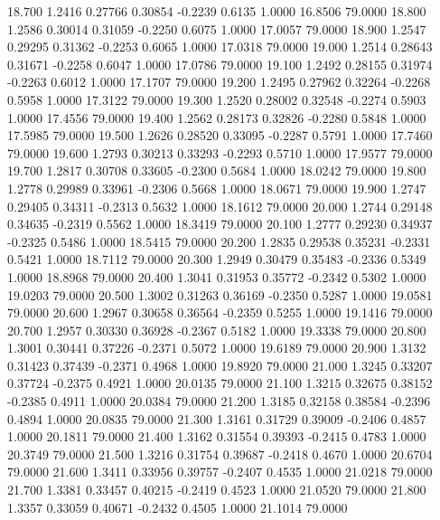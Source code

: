   18.700   1.2416   0.27766   0.30854  -0.2239   0.6135   1.0000  16.8506  79.0000
  18.800   1.2586   0.30014   0.31059  -0.2250   0.6075   1.0000  17.0057  79.0000
  18.900   1.2547   0.29295   0.31362  -0.2253   0.6065   1.0000  17.0318  79.0000
  19.000   1.2514   0.28643   0.31671  -0.2258   0.6047   1.0000  17.0786  79.0000
  19.100   1.2492   0.28155   0.31974  -0.2263   0.6012   1.0000  17.1707  79.0000
  19.200   1.2495   0.27962   0.32264  -0.2268   0.5958   1.0000  17.3122  79.0000
  19.300   1.2520   0.28002   0.32548  -0.2274   0.5903   1.0000  17.4556  79.0000
  19.400   1.2562   0.28173   0.32826  -0.2280   0.5848   1.0000  17.5985  79.0000
  19.500   1.2626   0.28520   0.33095  -0.2287   0.5791   1.0000  17.7460  79.0000
  19.600   1.2793   0.30213   0.33293  -0.2293   0.5710   1.0000  17.9577  79.0000
  19.700   1.2817   0.30708   0.33605  -0.2300   0.5684   1.0000  18.0242  79.0000
  19.800   1.2778   0.29989   0.33961  -0.2306   0.5668   1.0000  18.0671  79.0000
  19.900   1.2747   0.29405   0.34311  -0.2313   0.5632   1.0000  18.1612  79.0000
  20.000   1.2744   0.29148   0.34635  -0.2319   0.5562   1.0000  18.3419  79.0000
  20.100   1.2777   0.29230   0.34937  -0.2325   0.5486   1.0000  18.5415  79.0000
  20.200   1.2835   0.29538   0.35231  -0.2331   0.5421   1.0000  18.7112  79.0000
  20.300   1.2949   0.30479   0.35483  -0.2336   0.5349   1.0000  18.8968  79.0000
  20.400   1.3041   0.31953   0.35772  -0.2342   0.5302   1.0000  19.0203  79.0000
  20.500   1.3002   0.31263   0.36169  -0.2350   0.5287   1.0000  19.0581  79.0000
  20.600   1.2967   0.30658   0.36564  -0.2359   0.5255   1.0000  19.1416  79.0000
  20.700   1.2957   0.30330   0.36928  -0.2367   0.5182   1.0000  19.3338  79.0000
  20.800   1.3001   0.30441   0.37226  -0.2371   0.5072   1.0000  19.6189  79.0000
  20.900   1.3132   0.31423   0.37439  -0.2371   0.4968   1.0000  19.8920  79.0000
  21.000   1.3245   0.33207   0.37724  -0.2375   0.4921   1.0000  20.0135  79.0000
  21.100   1.3215   0.32675   0.38152  -0.2385   0.4911   1.0000  20.0384  79.0000
  21.200   1.3185   0.32158   0.38584  -0.2396   0.4894   1.0000  20.0835  79.0000
  21.300   1.3161   0.31729   0.39009  -0.2406   0.4857   1.0000  20.1811  79.0000
  21.400   1.3162   0.31554   0.39393  -0.2415   0.4783   1.0000  20.3749  79.0000
  21.500   1.3216   0.31754   0.39687  -0.2418   0.4670   1.0000  20.6704  79.0000
  21.600   1.3411   0.33956   0.39757  -0.2407   0.4535   1.0000  21.0218  79.0000
  21.700   1.3381   0.33457   0.40215  -0.2419   0.4523   1.0000  21.0520  79.0000
  21.800   1.3357   0.33059   0.40671  -0.2432   0.4505   1.0000  21.1014  79.0000
